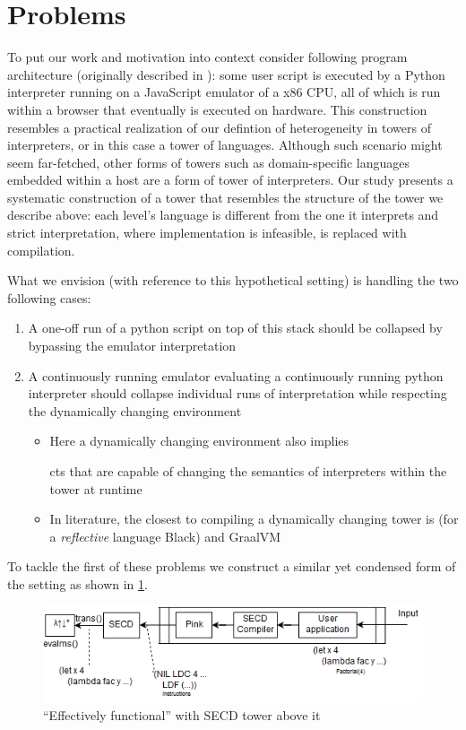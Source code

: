 \documentclass[fleqn]{article}
\theoremstyle{definition}
\begin{document}
\section{Problems}
To put our work and motivation into context consider following program architecture (originally described in \cite{amin2017collapsing}): some user script is executed by a Python interpreter running on a JavaScript emulator of a x86 CPU, all of which is run within a browser that eventually is executed on hardware. This construction resembles a practical realization of our defintion of heterogeneity in towers of interpreters, or in this case a tower of languages. Although such scenario might seem far-fetched, other forms of towers such as domain-specific languages embedded within a host are a form of tower of interpreters. Our study presents a systematic construction of a tower that resembles the structure of the tower we describe above: each level's language is different from the one it interprets and strict interpretation, where implementation is infeasible, is replaced with compilation.

What we envision (with reference to this hypothetical setting) is handling the two following cases:
\begin{enumerate}
	\item A one-off run of a python script on top of this stack should be collapsed by bypassing the emulator interpretation
	\item A continuously running emulator evaluating a continuously running python interpreter should collapse individual runs of interpretation while respecting the dynamically changing environment
	\begin{itemize}
		\item Here a dynamically changing environment also implies 
		
		cts that are capable of changing the semantics of interpreters within the tower at runtime
		\item In literature, the closest to compiling a dynamically changing tower is \cite{asai1997partial, amin2017collapsing} (for a \textit{reflective} language Black) and GraalVM \cite{wurthinger2013one}
	\end{itemize}
\end{enumerate}
To tackle the first of these problems we construct a similar yet condensed form of the setting as shown in \ref{secd_tower_arch}.

\begin{figure}[t]
	\centering
	\includegraphics[scale=0.75]{secd_arch.png}
	\caption{``Effectively functional'' \mslangStar with SECD tower above it}\label{secd_tower_arch}
\end{figure}
\end{document}
